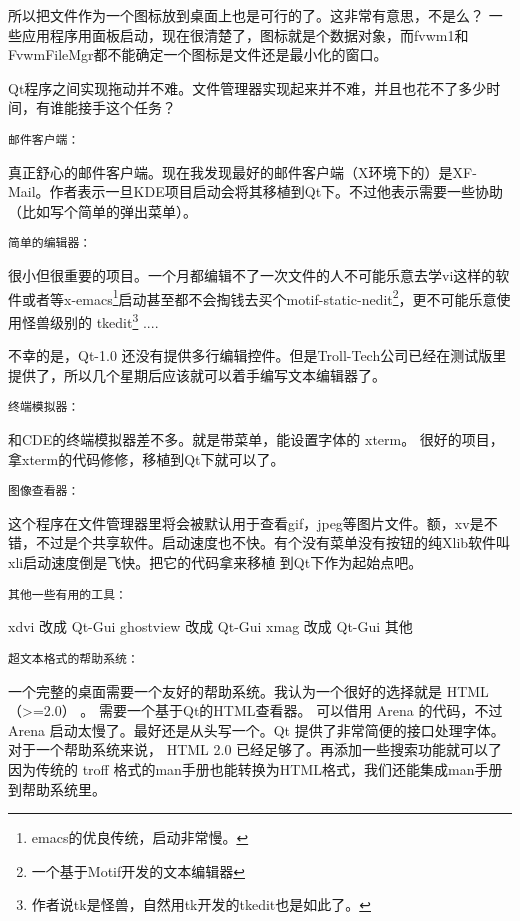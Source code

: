 \documentclass[amstex,twoside]{ctexbook}
\newenvironment{insertnote}{ \ttfamily\CJKfamily{KaiTi} }{\vskip 0.5cm }
\begin{document}
\begin{insertnote}
{    所以把文件作为一个图标放到桌面上也是可行的了。这非常有意思，不是么？ 一些应用程序用面板启动，现在很清楚了，图标就是个数据对象，而fvwm1和 FvwmFileMgr都不能确定一个图标是文件还是最小化的窗口。    

    Qt程序之间实现拖动并不难。文件管理器实现起来并不难，并且也花不了多少时间，有谁能接手这个任务？
    
{ \noindent \tt 邮件客户端：}

    真正舒心的邮件客户端。现在我发现最好的邮件客户端（X环境下的）是XF-Mail。作者表示一旦KDE项目启动会将其移植到Qt下。不过他表示需要一些协助（比如写个简单的弹出菜单）。 
   
{ \noindent \tt 简单的编辑器：}

    很小但很重要的项目。一个月都编辑不了一次文件的人不可能乐意去学vi这样的软件或者等x-emacs\footnote{emacs的优良传统，启动非常慢。}启动甚至都不会掏钱去买个motif-static-nedit\footnote{一个基于Motif开发的文本编辑器}，更不可能乐意使用怪兽级别的 tkedit\footnote{作者说tk是怪兽，自然用tk开发的tkedit也是如此了。} ....

	不幸的是，Qt-1.0 还没有提供多行编辑控件。但是Troll-Tech公司已经在测试版里提供了，所以几个星期后应该就可以着手编写文本编辑器了。
	
{ \noindent \tt 终端模拟器：}

    和CDE的终端模拟器差不多。就是带菜单，能设置字体的 xterm。 很好的项目，拿xterm的代码修修，移植到Qt下就可以了。
    
{ \noindent \tt 图像查看器：}

    这个程序在文件管理器里将会被默认用于查看gif，jpeg等图片文件。额，xv是不错，不过是个共享软件。启动速度也不快。有个没有菜单没有按钮的纯Xlib软件叫xli启动速度倒是飞快。把它的代码拿来移植
    到Qt下作为起始点吧。 %
    
    
{ \noindent \tt 其他一些有用的工具：}

        xdvi 改成 Qt-Gui
        ghostview 改成 Qt-Gui
        xmag 改成 Qt-Gui
        其他

{ \noindent \tt 超文本格式的帮助系统：}

    一个完整的桌面需要一个友好的帮助系统。我认为一个很好的选择就是 HTML （>=2.0） 。 需要一个基于Qt的HTML查看器。
    可以借用 Arena 的代码，不过Arena 启动太慢了。最好还是从头写一个。Qt 提供了非常简便的接口处理字体。对于一个帮助系统来说， HTML 2.0 已经足够了。再添加一些搜索功能就可以了
    因为传统的 troff 格式的man手册也能转换为HTML格式，我们还能集成man手册到帮助系统里。

}
\end{insertnote}
\end{document}
